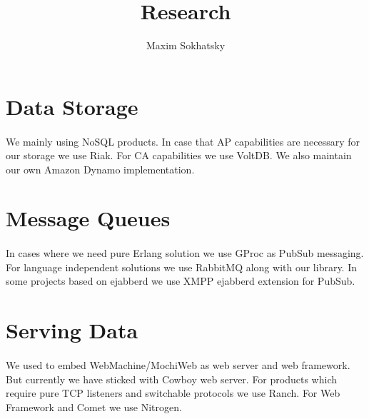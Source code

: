 \documentclass[11pt]{article}
\begin{document}
\title{Research}
\author{Maxim Sokhatsky}


\section*{Data Storage}
\paragraph{}
    We mainly using NoSQL products. In case that AP capabilities are necessary
    for our storage we use Riak. For CA capabilities we use VoltDB.
    We also maintain our own Amazon Dynamo implementation.

\section*{Message Queues}
\paragraph{}
    In cases where we need pure Erlang solution we use GProc as PubSub messaging.
    For language independent solutions we use RabbitMQ along with our library.
    In some projects based on ejabberd we use XMPP ejabberd extension for PubSub.

\section*{Serving Data}
\paragraph{}
    We used to embed WebMachine/MochiWeb as web server and web framework.
    But currently we have sticked with Cowboy web server.
    For products which require pure TCP listeners and switchable protocols we use Ranch.
    For Web Framework and Comet we use Nitrogen.

\end{document}
